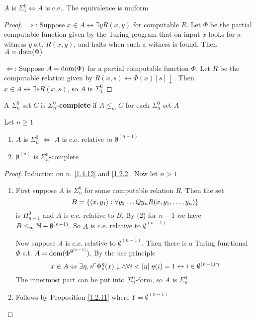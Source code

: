 \documentclass[11pt]{article}
\begin{document}
\begin{fact}[]
\label{1.4.12}
\(A\) is \(\Sigma_1^0\Leftrightarrow A\) is c.e.. The equivalence is uniform
\end{fact}

\begin{proof}
\(\Rightarrow\): Suppose \(x\in A\leftrightarrow\exists y R(x,y)\) for computable \(R\). Let \(\Phi\) be the partial computable
function given by the Turing program that on input \(x\) looks for a witness \(y\)
s.t. \(R(x,y)\), and halts when such a witness is found. Then \(A=\operatorname{dom}(\Phi)\)

\(\Leftarrow\): Suppose \(A=\operatorname{dom}(\Phi)\) for a partial computable function \(\Phi\). Let \(R\) be the computable
relation given by \(R(x,s)\leftrightarrow\Phi(x)[s]\downarrow\). Then \(x\in A\leftrightarrow\exists sR(x,s)\), so \(A\) is \(\Sigma_1^0\)
\end{proof}

A \(\Sigma_n^0\) set \(C\) is \textbf{\(\Sigma_n^0\)-complete} if \(A\le_mC\) for each \(\Sigma_n^0\) set \(A\)

\begin{theorem}[]
\label{1.4.13}
Let \(n\ge 1\)
\begin{enumerate}
\item \(A\) is \(\Sigma_n^0\) \(\Leftrightarrow\) \(A\) is c.e. relative to \(\emptyset^{(n-1)}\)
\item \(\emptyset^{(n)}\) is \(\Sigma_n^0\)-complete
\end{enumerate}
\end{theorem}

\begin{proof}
Induction on \(n\).  \ref{1.4.12} and \ref{1.2.2}. Now let \(n>1\)
\begin{enumerate}
\item First suppose \(A\) is \(\Sigma_n^0\) for some computable relation \(R\). Then the set
\begin{equation*}
B=\{\langle x,y_1\rangle:\forall y_2\dots Qy_nR(x,y_1,\dots,y_n)\}
\end{equation*}
is \(\Pi_{n-1}^0\) and \(A\) is c.e. relative to \(B\). By (2) for \(n-1\) we
have \(B\le_m\mathbb{N}-\emptyset^{(n-1)}\). So \(A\) is c.e. relative to \(\emptyset^{(n-1)}\)

Now suppose \(A\) is c.e. relative to \(\emptyset^{(n-1)}\). Then there is a Turing functional \(\Phi\)
s.t. \(A=\operatorname{dom}(\Phi^{\emptyset^{(n-1)}})\). By the use principle
\begin{equation*}
x\in A\Leftrightarrow\exists\eta,s\ucorner{\Phi_s^\eta(x)\downarrow\wedge\forall i<\abs{\eta}\;\eta(i)=1\leftrightarrow i\in\emptyset^{(n-1)}}
\end{equation*}
The innermost part can be put into \(\Sigma_n^0\)-form, so \(A\) is \(\Sigma_n^0\).
\item Follows by Proposition \ref{1.2.11} where \(Y=\emptyset^{(n-1)}\)
\end{enumerate}
\end{proof}
\end{document}
